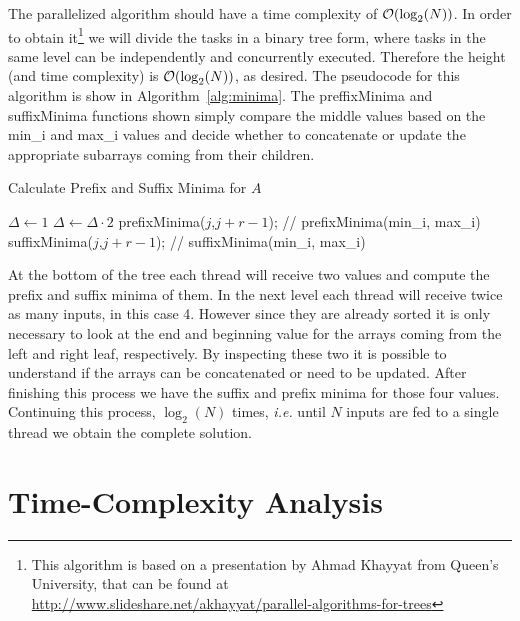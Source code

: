 The parallelized algorithm should have a time complexity of $\mathcal{O}(\log_2(N))$. In order to obtain it\footnote{This algorithm is based on a presentation by Ahmad Khayyat from Queen's University, that can be found at \url{http://www.slideshare.net/akhayyat/parallel-algorithms-for-trees}} we will divide the tasks in a binary tree form, where tasks in the same level can be independently and concurrently executed. Therefore the height (and time complexity) is $\mathcal{O}(\log_2(N))$, as desired.
The pseudocode for this algorithm is show in Algorithm~\ref{alg:minima}. The preffixMinima and suffixMinima functions shown simply compare the middle values based on the min\_i and max\_i values and decide whether to concatenate or update the appropriate subarrays coming from their children.

\begin{algorithm}[H]
\caption{Calculate Prefix and Suffix Minima for $A$}
\label{alg:minima}
\begin{algorithmic}[1]
	\STATE $\Delta \leftarrow 1$
		\STATE $\Delta \leftarrow \Delta \cdot 2$
		\renewcommand{\algorithmicdo}{\textbf{pardo}}
			\STATE prefixMinima($j$,$j+r-1$); // prefixMinima(min\_i, max\_i)
			\STATE suffixMinima($j$,$j+r-1$); // suffixMinima(min\_i, max\_i)
		\ENDFOR
	\ENDFOR
\end{algorithmic}
\end{algorithm}


At the bottom of the tree each thread will receive two values and compute the prefix and suffix minima of them. In the next level each thread will receive twice as many inputs, in this case 4. However since they are already sorted it is only necessary to look at the end and beginning value for the arrays coming from the left and right leaf, respectively. By inspecting these two it is possible to understand if the arrays can be concatenated or need to be updated. After finishing this process we have the suffix and prefix minima for those four values. Continuing this process, $\log_2(N)$ times, \emph{i.e.} until $N$ inputs are fed to a single thread we obtain the complete solution.

\section{Time-Complexity Analysis}

